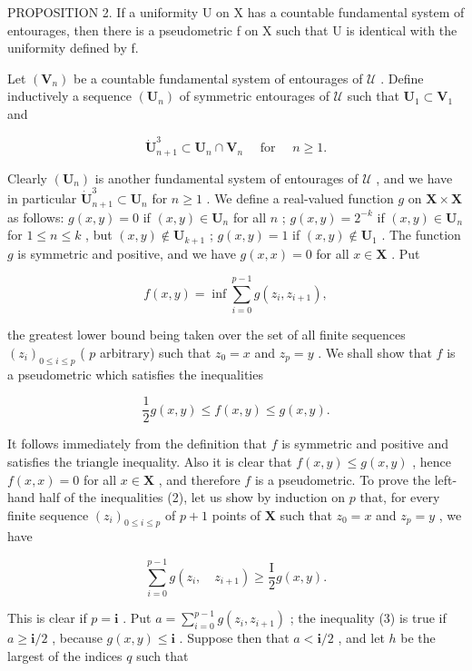 PROPOSITION 2. If a uniformity U on X has a countable fundamental system of entourages, then there is a pseudometric f on X such that U is identical with the uniformity defined by f.

Let \((\mathbf{V}_n)\) be a countable fundamental system of entourages of \(\mathcal{U}\) . Define inductively a sequence \((\mathbf{U}_n)\) of symmetric entourages of \(\mathcal{U}\) such that \(\mathbf{U}_1 \subset \mathbf{V}_1\) and

\[
\mathbf {\dot {U}} _ {n + 1} ^ {3} \subset \mathbf {U} _ {n} \cap \mathbf {V} _ {n} \quad \text {   for   } \quad n \geqslant 1.
\]

Clearly \((\mathbf{U}_n)\) is another fundamental system of entourages of \(\mathcal{U}\) , and we have in particular \(\dot{\mathbf{U}}_{n+1}^3 \subset \mathbf{U}_n\) for \(n \geqslant 1\) . We define a real-valued function \(g\) on \(\mathbf{X} \times \mathbf{X}\) as follows: \(g(x, y) = 0\) if \((x, y) \in \mathbf{U}_n\) for all \(n\) ; \(g(x, y) = 2^{-k}\) if \((x, y) \in \mathbf{U}_n\) for \(1 \leqslant n \leqslant k\) , but \((x, y) \notin \mathbf{U}_{k+1}\) ; \(g(x, y) = 1\) if \((x, y) \notin \mathbf{U}_1\) . The function \(g\) is symmetric and positive, and we have \(g(x, x) = 0\) for all \(x \in \mathbf{X}\) . Put

\[
f (x, y) = \inf \sum_ {i = 0} ^ {p - 1} g \left(z _ {i}, z _ {i + 1}\right),
\]

the greatest lower bound being taken over the set of all finite sequences \((z_{i})_{0\leqslant i\leqslant p}\) ( \(p\) arbitrary) such that \(z_0 = x\) and \(z_{p} = y\) . We shall show that \(f\) is a pseudometric which satisfies the inequalities

\[
\frac {1}{2} g (x, y) \leqslant f (x, y) \leqslant g (x, y).\tag{2}
\]

It follows immediately from the definition that \(f\) is symmetric and positive and satisfies the triangle inequality. Also it is clear that \(f(x, y) \leqslant g(x, y)\) , hence \(f(x, x) = 0\) for all \(x \in \mathbf{X}\) , and therefore \(f\) is a pseudometric. To prove the left-hand half of the inequalities (2), let us show by induction on \(p\) that, for every finite sequence \((z_i)_{0 \leqslant i \leqslant p}\) of \(p + 1\) points of \(\mathbf{X}\) such that \(z_0 = x\) and \(z_p = y\) , we have

\[
\sum_ {i = 0} ^ {p - 1} g (z _ {i}, \quad z _ {i + 1}) \geqslant \frac {\mathrm{I}}{2} g (x, y).\tag{3}
\]

This is clear if \(p = \mathbf{i}\) . Put \(a = \sum_{i=0}^{p-1} g(z_i, z_{i+1})\) ; the inequality (3) is true if \(a \geqslant \mathbf{i}/2\) , because \(g(x, y) \leqslant \mathbf{i}\) . Suppose then that \(a < \mathbf{i}/2\) , and let \(h\) be the largest of the indices \(q\) such that

